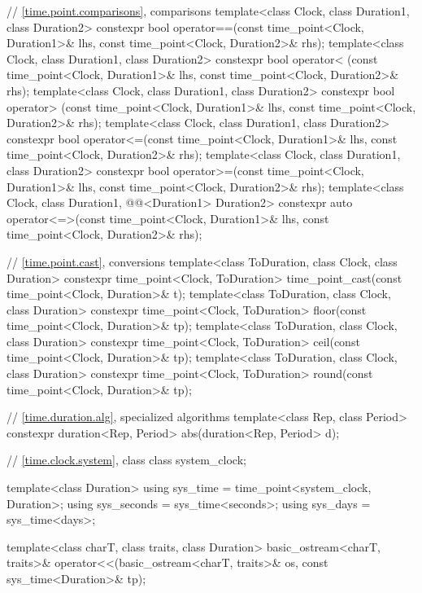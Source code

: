 \begin{codeblock}
{  // \ref{time.point.comparisons},  comparisons
  template<class Clock, class Duration1, class Duration2>
    constexpr bool operator==(const time_point<Clock, Duration1>& lhs,
                              const time_point<Clock, Duration2>& rhs);
  template<class Clock, class Duration1, class Duration2>
    constexpr bool operator< (const time_point<Clock, Duration1>& lhs,
                              const time_point<Clock, Duration2>& rhs);
  template<class Clock, class Duration1, class Duration2>
    constexpr bool operator> (const time_point<Clock, Duration1>& lhs,
                              const time_point<Clock, Duration2>& rhs);
  template<class Clock, class Duration1, class Duration2>
    constexpr bool operator<=(const time_point<Clock, Duration1>& lhs,
                              const time_point<Clock, Duration2>& rhs);
  template<class Clock, class Duration1, class Duration2>
    constexpr bool operator>=(const time_point<Clock, Duration1>& lhs,
                              const time_point<Clock, Duration2>& rhs);
  template<class Clock, class Duration1, @@<Duration1> Duration2>
    constexpr auto operator<=>(const time_point<Clock, Duration1>& lhs,
                               const time_point<Clock, Duration2>& rhs);

  // \ref{time.point.cast}, conversions
  template<class ToDuration, class Clock, class Duration>
    constexpr time_point<Clock, ToDuration>
      time_point_cast(const time_point<Clock, Duration>& t);
  template<class ToDuration, class Clock, class Duration>
    constexpr time_point<Clock, ToDuration> floor(const time_point<Clock, Duration>& tp);
  template<class ToDuration, class Clock, class Duration>
    constexpr time_point<Clock, ToDuration> ceil(const time_point<Clock, Duration>& tp);
  template<class ToDuration, class Clock, class Duration>
    constexpr time_point<Clock, ToDuration> round(const time_point<Clock, Duration>& tp);

  // \ref{time.duration.alg}, specialized algorithms
  template<class Rep, class Period>
    constexpr duration<Rep, Period> abs(duration<Rep, Period> d);

  // \ref{time.clock.system}, class 
  class system_clock;

  template<class Duration>
    using sys_time  = time_point<system_clock, Duration>;
  using sys_seconds = sys_time<seconds>;
  using sys_days    = sys_time<days>;

  template<class charT, class traits, class Duration>
    basic_ostream<charT, traits>&
      operator<<(basic_ostream<charT, traits>& os, const sys_time<Duration>& tp);

}
\end{codeblock}

